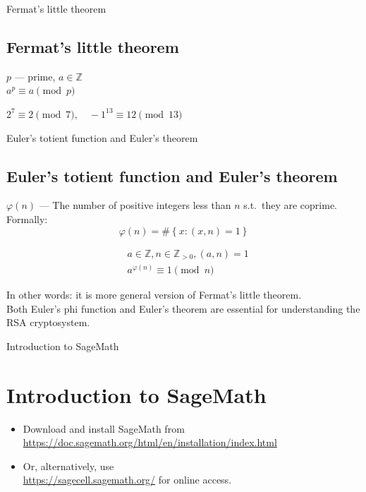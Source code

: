 \documentclass{beamer}
\begin{document}
\begin{frame}{Fermat's little theorem}
    \subsection{Fermat's little theorem}
    \begin{Theorem}
        $p$ --- prime, $a \in \mathbb{Z}$ \\
        $a^p \equiv a \pmod p$
    \end{Theorem}
    \begin{example}
        $ 2^7 \equiv 2 \pmod 7, \quad -1^{13} \equiv 12 \pmod {13} $
    \end{example}
\end{frame}

\begin{frame}{Euler's totient function and Euler's theorem}
    \subsection{Euler's totient function and Euler's theorem}
    \begin{definition}
        $\varphi(n)$ --- The number of positive integers less than $n$ s.t.\ they
        are coprime. Formally:
        \begin{equation*}
            \varphi(n) = \# \left\{ x : (x, n) = 1 \right\}
        \end{equation*} 
    \end{definition}
    \begin{Theorem}
        \begin{eqnarray*}
            & a \in \mathbb{Z}, n \in \mathbb{Z}_{>0}, (a, n) = 1 \\
            & a^{\varphi(n)} \equiv 1 \pmod n
        \end{eqnarray*}
    \end{Theorem}
    In other words: it is more general version of Fermat's little theorem. \\
    Both Euler's phi function and Euler's theorem are essential for 
    understanding the RSA cryptosystem.
\end{frame}

\begin{frame}{Introduction to SageMath}
    \section{Introduction to SageMath}
    \begin{itemize}
        \item Download and install SageMath from \\ 
            \url{https://doc.sagemath.org/html/en/installation/index.html}
        \item Or, alternatively, use \\ 
            \url{https://sagecell.sagemath.org/} for online access.
    \end{itemize}
\end{frame}
\end{document}

